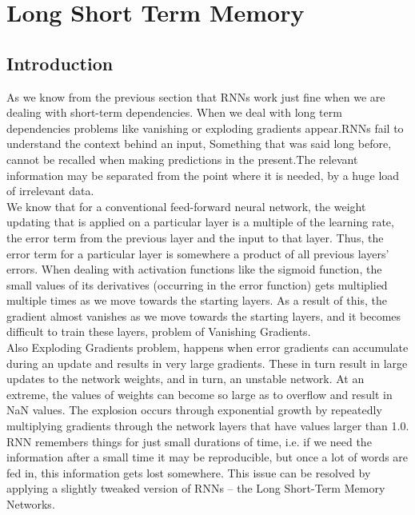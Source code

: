 \section{Long Short Term Memory}
\label{chap:Long Short Term Memory}

\subsection{Introduction}
As we know from the previous section that RNNs work just fine when we are dealing with short-term dependencies.
When we deal with long term dependencies problems like vanishing or exploding gradients appear.RNNs fail to understand the context behind an input, Something that was said long before, cannot be recalled when making predictions in the present.The relevant information may be separated from the point where it is needed, by a huge load of irrelevant data.\cite{web022}\\
We know that for a conventional feed-forward neural network, the weight updating that is applied on a particular layer is a multiple of the learning rate, the error term from the previous layer and the input to that layer. Thus, the error term for a particular layer is somewhere a product of all previous layers’ errors. When dealing with activation functions like the sigmoid function, the small values of its derivatives (occurring in the error function) gets multiplied multiple times as we move towards the starting layers. As a result of this, the gradient almost vanishes as we move towards the starting layers, and it becomes difficult to train these layers, problem of Vanishing Gradients.\\
Also Exploding Gradients problem, happens when error gradients can accumulate during an update and results in very large gradients. These in turn result in large updates to the network weights, and in turn, an unstable network. At an extreme, the values of weights can become so large as to overflow and result in NaN values. The explosion occurs through exponential growth by repeatedly multiplying gradients through the network layers that have values larger than 1.0.\\
RNN remembers things for just small durations of time, i.e. if we need the information after a small time it may be reproducible, but once a lot of words are fed in, this information gets lost somewhere. This issue can be resolved by applying a slightly tweaked version of RNNs – the Long Short-Term Memory Networks.\cite{web005}

